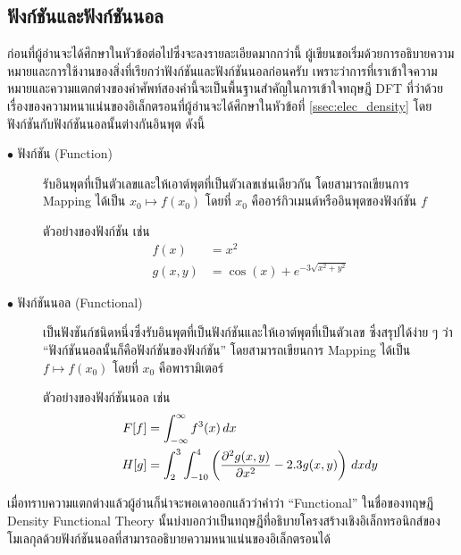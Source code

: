 \subsection{ฟังก์ชันและฟังก์ชันนอล}
\label{ssec:function_functional}

ก่อนที่ผู้อ่านจะได้ศึกษาในหัวข้อต่อไปซึ่งจะลงรายละเอียดมากกว่านี้ ผู้เขียนขอเริ่มด้วยการอธิบายความหมายและการใช้งานของสิ่งที่เรียกว่าฟังก์ชันและฟังก์ชันนอลก่อนครับ เพราะว่าการที่เราเข้าใจความหมายและความแตกต่างของคำศัพท์สองคำนี้จะเป็นพื้นฐานสำคัญในการเข้าใจทฤษฎี DFT ที่ว่าด้วยเรื่องของความหนาแน่นของอิเล็กตรอนที่ผู้อ่านจะได้ศึกษาในหัวข้อที่ \ref{ssec:elec_density} โดยฟังก์ชันกับฟังก์ชันนอลนั้นต่างกันอินพุต ดังนี้

\begin{description}
    \item[$\bullet$ ฟังก์ชัน (Function)] รับอินพุตที่เป็นตัวเลขและให้เอาต์พุตที่เป็นตัวเลขเช่นเดียวกัน โดยสามารถเขียนการ Mapping ได้เป็น $x_0 \mapsto f(x_0)$ โดยที่ $x_{0}$ คืออาร์กิวเมนต์หรืออินพุตของฟังก์ชัน $f$

        ตัวอย่างของฟังก์ชัน เช่น
        \begin{align*}
            f(x)   & = x^{2}                                \\
            g(x,y) & = \cos(x) + e^{-3\sqrt{x^{2} + y^{2}}}
        \end{align*}

    \item[$\bullet$ ฟังก์ชันนอล (Functional)] เป็นฟังชันก์ชนิดหนึ่งซึ่งรับอินพุตที่เป็นฟังก์ชันและให้เอาต์พุตที่เป็นตัวเลข ซึ่งสรุปได้ง่าย ๆ ว่า \enquote{ฟังก์ชันนอลนั้นก็คือฟังก์ชันของฟังก์ชัน} โดยสามารถเขียนการ Mapping ได้เป็น $f \mapsto f(x_0)$ โดยที่ $x_{0}$ คือพารามิเตอร์

        ตัวอย่างของฟังก์ชันนอล เช่น
        \begin{align*}
            F[f] & = \int^{\infty}_{-\infty} f^{3}(x) \, dx                                                \\
            H[g] & = \int^{3}_{2} \int^{4}_{-10} \left ( \pdv[2]{g(x,y)}{x} - 2.3 g(x,y) \right ) \, dx dy
        \end{align*}
\end{description}

เมื่อทราบความแตกต่างแล้วผู้อ่านก็น่าจะพอเดาออกแล้วว่าคำว่า \enquote{Functional} ในชื่อของทฤษฎี Density Functional Theory นั้นบ่งบอกว่าเป็นทฤษฎีที่อธิบายโครงสร้างเชิงอิเล็กทรอนิกส์ของโมเลกุลด้วยฟังก์ชันนอลที่สามารถอธิบายความหนาแน่นของอิเล็กตรอนได้


